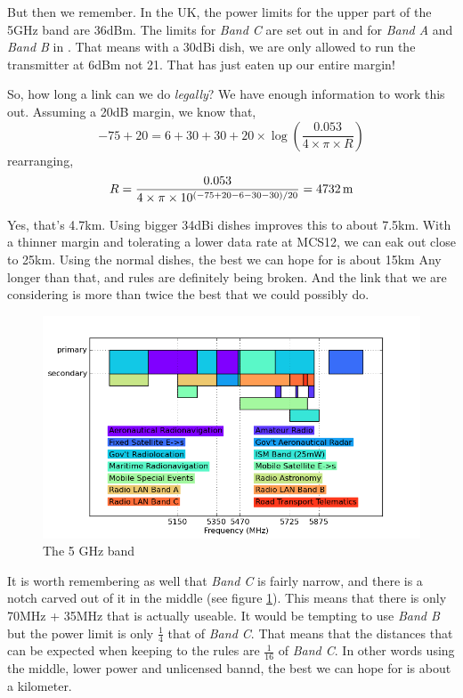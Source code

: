 But then we remember. In the UK, the power limits for the upper part
of the 5GHz band are 36dBm. The limits for \textit{Band C} are set out
in \cite{IR2007} and for \textit{Band A} and \textit{Band B} in
\cite{IR2006}. That means with a 30dBi dish, we are only allowed to
run the transmitter at 6dBm not 21. That has just eaten up our entire
margin!

So, how long a link can we do \textit{legally}? We have enough
information to work this out. Assuming a 20dB margin, we know that,
$$
-75 + 20 = 6 + 30 + 30 + 20 \times
\log \left(\frac{0.053}{4 \times \pi \times R} \right)
$$
rearranging,
$$
R = \frac{%
  0.053
}{%
  4 \times \pi \times 10^{\left(-75 + 20 - 6 - 30 - 30\right)/20}%
} = 4732\, \mathrm{m}
$$

Yes, that's 4.7km. Using bigger 34dBi dishes improves this to about
7.5km. With a thinner margin and tolerating a lower data rate at
MCS12, we can eak out close to 25km. Using the normal dishes, the best
we can hope for is about 15km Any longer than that, and rules are
definitely being broken. And the link that we are considering is more
than twice the best that we could possibly do.

\begin{figure}[h]
  \begin{center}
    \includegraphics[width=\textwidth]{spectrum.png}
  \end{center}
  \caption{The 5 GHz band}
  \label{fig:5GHz}
\end{figure}

It is worth remembering as well that \textit{Band C} is fairly narrow,
and there is a notch carved out of it in the middle (see figure
\ref{fig:5GHz}). This means that there is only 70MHz + 35MHz that is
actually useable. It would be tempting to use \textit{Band B} but the
power limit is only $\frac{1}{4}$ that of \textit{Band C}. That means
that the distances that can be expected when keeping to the rules are
$\frac{1}{16}$ of \textit{Band C}. In other words using the middle,
lower power and unlicensed bannd, the best we can hope for is about a
kilometer.

